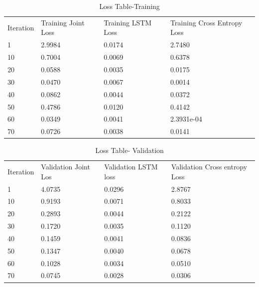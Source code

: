 \documentclass[sigconf]{acmart}
\begin{document}
\begin{table}[]
\centering
\caption{Loss Table-Training}
\label{table1}
\begin{tabular}{llll}
Iteration & Training Joint Loss & Training LSTM Loss & Training Cross Entropy Loss \\
1         & 2.9984              & 0.0174             & 2.7480                      \\
10        & 0.7004              & 0.0069             & 0.6378                      \\
20        & 0.0588              & 0.0035             & 0.0175                      \\
30        & 0.0470              & 0.0067             & 0.0014                      \\
40        & 0.0862              & 0.0044             & 0.0372                      \\
50        & 0.4786              & 0.0120             & 0.4142                      \\
60        & 0.0349              & 0.0041             & 2.3931e-04                  \\
70        & 0.0726              & 0.0038             & 0.0141                     
\end{tabular}
\end{table}

\begin{table}[]
\centering
\caption{Loss Table- Validation}
\label{table2}
\begin{tabular}{llll}
Iteration & Validation Joint Los & Validation LSTM loss & Validation Cross entropy Loss \\
1         & 4.0735               & 0.0296               & 2.8767                        \\
10        & 0.9193               & 0.0071               & 0.8033                        \\
20        & 0.2893               & 0.0044               & 0.2122                        \\
30        & 0.1720               & 0.0035               & 0.1120                        \\
40        & 0.1459               & 0.0041               & 0.0836                        \\
50        & 0.1347               & 0.0040               & 0.0678                        \\
60        & 0.1028               & 0.0034               & 0.0510                        \\
70        & 0.0745               & 0.0028               & 0.0306                       
\end{tabular}
\end{table}
\end{document}
